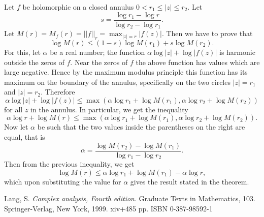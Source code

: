 \documentclass[12pt]{article}
\begin{document}
Let $f$ be holomorphic on a closed annulus $0<r_1\le |z|\le r_2$. Let
$$
s=\frac{\log r_1-\log r}{\log r_2-\log r_1}.
$$
Let $M(r)=M_f(r)=||f||_r=\max_{|z|=r}|f(z)|$. Then we have to prove that
$$
\log M(r)\le (1-s)\log M(r_1)+s\log M(r_2).
$$
For this, let $\alpha$ be a real number; the function $\alpha\log|z|+\log|f(z)|$ is harmonic outside the zeros of $f$. Near the zeros of $f$ the above function has values which are large negative. Hence by the maximum modulus principle this function has its maximum on the boundary of the annulus, specifically on the two circles $|z|=r_1$ and $|z|=r_2$. Therefore
$$
\alpha\log|z|+\log|f(z)|\le\max(\alpha\log r_1+\log M(r_1),\alpha\log r_2+\log M(r_2)) 
$$
for all $z$ in the annulus. In particular, we get the inequality
$$
\alpha\log r+\log M(r)\le\max(\alpha\log r_1+\log M(r_1),\alpha\log r_2+\log M(r_2)). 
$$
Now let $\alpha$ be such that the two values inside the parentheses on the right are equal, that is
$$
\alpha=\frac{\log M(r_2)-\log M(r_1)}{\log r_1-\log r_2}.
$$
Then from the previous inequality, we get
$$
\log M(r)\le\alpha\log r_1+\log M(r_1)-\alpha\log r,
$$
which upon substituting the value for $\alpha$ gives the result stated in the theorem.

\begin{thebibliography}
{}Lang, S.
\emph{Complex analysis, Fourth edition}. Graduate Texts in Mathematics, 103.
Springer-Verlag, New York, 1999. xiv+485 pp. ISBN 0-387-98592-1 
\end{thebibliography}
\end{document}
